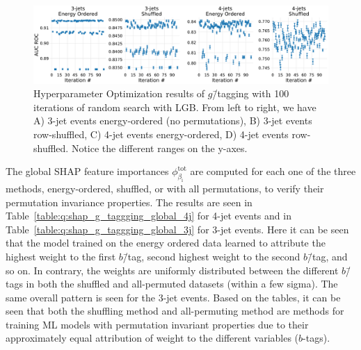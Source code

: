 \begin{figure}[h!]%
  \centerfloat
  \includegraphics[width=1\textwidth, trim=0 0 0 0, clip]{figures/quarks/cv_res_lgb-gtag-down_sample=1.00-ML_vars=vertex-selection=b-ejet_min=4-n_iter_RS_lgb=99-n_iter_RS_xgb=9-cdot_cut=0.90-version=19.pdf}
  \vspace{3mm}
  \caption[Hyperparameter Optimization of $g$\=/tagging]{
    Hyperparameter Optimization results of $g$\=/tagging with \num{100} iterations of random search with LGB. From left to right, we have A) 3-jet events energy-ordered (no permutations), B) 3-jet events row-shuffled, C) 4-jet events energy-ordered, D) 4-jet events row-shuffled. Notice the different ranges on the y-axes.}
  \label{fig:q:CV_res_iterations_g_tagging}%
\end{figure}

The global SHAP feature importances $\phi^\mathrm{tot}_{\beta_\mathrm{i}}$ are computed for each one of the three methods, energy-ordered, shuffled, or with all permutations, to verify their permutation invariance properties. The results are seen in Table~\ref{table:q:shap_g_taggging_global_4j} for 4-jet events and in Table~\ref{table:q:shap_g_taggging_global_3j} for 3-jet events. Here it can be seen that the model trained on the energy ordered data learned to attribute the highest weight to the first $b$\=/tag, second highest weight to the second $b$\=/tag, and so on. In contrary, the weights are uniformly distributed between the different $b$\=/tags in both the shuffled and all-permuted datasets (within a few sigma). The same overall pattern is seen for the 3-jet events. Based on the tables, it can be seen that both the shuffling method and all-permuting method are methods for training ML models with permutation invariant properties due to their approximately equal attribution of weight to the different variables ($b$-tags). 

